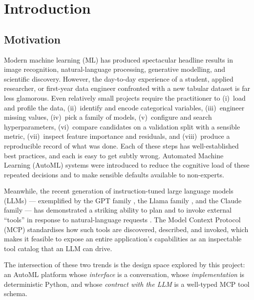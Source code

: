 \chapter{Introduction}
\label{ch:intro}


\section{Motivation}
\label{sec:motivation}

Modern machine learning (ML) has produced spectacular headline results
in image recognition, natural-language processing, generative modelling,
and scientific discovery. However, the day-to-day experience of a
student, applied researcher, or first-year data engineer confronted with
a new tabular dataset is far less glamorous. Even relatively small
projects require the practitioner to (i)~load and profile the data,
(ii)~identify and encode categorical variables, (iii)~engineer missing
values, (iv)~pick a family of models, (v)~configure and search
hyperparameters, (vi)~compare candidates on a validation split with a
sensible metric, (vii)~inspect feature importance and residuals, and
(viii)~produce a reproducible record of what was done.
Each of these steps has well-established best practices, and each is
easy to get subtly wrong. Automated Machine Learning (AutoML) systems
\citep{feurer2015autosklearn, olson2016tpot, ledell2020h2o, jin2019autokeras}
were introduced to reduce the cognitive load of these repeated
decisions and to make sensible defaults available to non-experts.

Meanwhile, the recent generation of instruction-tuned large language
models (LLMs) --- exemplified by the GPT family
\citep{brown2020gpt3, openai2023gpt4}, the Llama family
\citep{touvron2023llama, llama3card}, and the Claude family --- has
demonstrated a striking ability to plan and to invoke external ``tools''
in response to natural-language requests
\citep{schick2023toolformer, yao2023react, patil2023gorilla,
openai2023function}. The Model Context Protocol (MCP)
\citep{mcpSpec2024, anthropic2024mcp} standardises how such tools are
discovered, described, and invoked, which makes it feasible to expose
an entire application's capabilities as an inspectable tool catalog
that an LLM can drive.

The intersection of these two trends is the design space explored by
this project: an AutoML platform whose \emph{interface} is a
conversation, whose \emph{implementation} is deterministic Python, and
whose \emph{contract with the LLM} is a well-typed MCP tool schema.

